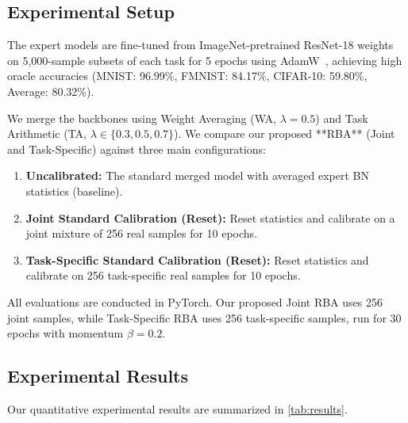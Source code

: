 \documentclass{article}
\begin{document}
\subsection{Experimental Setup}
The expert models are fine-tuned from ImageNet-pretrained ResNet-18 weights on 5,000-sample subsets of each task for 5 epochs using AdamW~\cite{loshchilov2017decoupled, kingma2014adam}, achieving high oracle accuracies (MNIST: 96.99\%, FMNIST: 84.17\%, CIFAR-10: 59.80\%, Average: 80.32\%).

We merge the backbones using Weight Averaging (WA, $\lambda=0.5$) and Task Arithmetic (TA, $\lambda \in \{0.3, 0.5, 0.7\}$). We compare our proposed **RBA** (Joint and Task-Specific) against three main configurations:
\begin{enumerate}
  \item \textbf{Uncalibrated:} The standard merged model with averaged expert BN statistics (baseline).
  \item \textbf{Joint Standard Calibration (Reset):} Reset statistics and calibrate on a joint mixture of 256 real samples for 10 epochs.
  \item \textbf{Task-Specific Standard Calibration (Reset):} Reset statistics and calibrate on 256 task-specific real samples for 10 epochs.
\end{enumerate}

All evaluations are conducted in PyTorch. Our proposed Joint RBA uses 256 joint samples, while Task-Specific RBA uses 256 task-specific samples, run for 30 epochs with momentum $\beta = 0.2$.

\subsection{Experimental Results}

Our quantitative experimental results are summarized in \cref{tab:results}.
\end{document}
